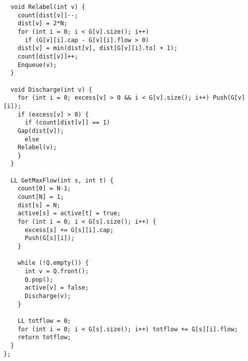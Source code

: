 \begin{lstlisting}
  void Relabel(int v) {
    count[dist[v]]--;
    dist[v] = 2*N;
    for (int i = 0; i < G[v].size(); i++) 
      if (G[v][i].cap - G[v][i].flow > 0)
	dist[v] = min(dist[v], dist[G[v][i].to] + 1);
    count[dist[v]]++;
    Enqueue(v);
  }

  void Discharge(int v) {
    for (int i = 0; excess[v] > 0 && i < G[v].size(); i++) Push(G[v][i]);
    if (excess[v] > 0) {
      if (count[dist[v]] == 1) 
	Gap(dist[v]); 
      else
	Relabel(v);
    }
  }

  LL GetMaxFlow(int s, int t) {
    count[0] = N-1;
    count[N] = 1;
    dist[s] = N;
    active[s] = active[t] = true;
    for (int i = 0; i < G[s].size(); i++) {
      excess[s] += G[s][i].cap;
      Push(G[s][i]);
    }
    
    while (!Q.empty()) {
      int v = Q.front();
      Q.pop();
      active[v] = false;
      Discharge(v);
    }
    
    LL totflow = 0;
    for (int i = 0; i < G[s].size(); i++) totflow += G[s][i].flow;
    return totflow;
  }
};

\end{lstlisting}
